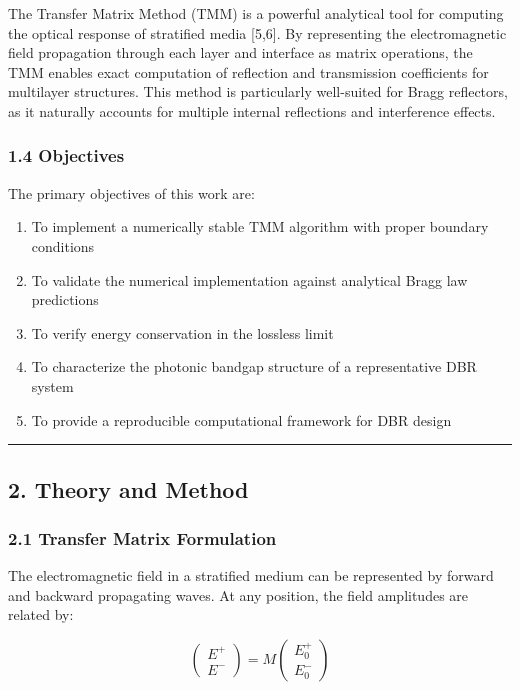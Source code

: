 \documentclass[
]{article}
\providecommand{\tightlist}{%
  \setlength{\itemsep}{0pt}\setlength{\parskip}{0pt}}
\begin{document}
The Transfer Matrix Method (TMM) is a powerful analytical tool for
computing the optical response of stratified media {[}5,6{]}. By
representing the electromagnetic field propagation through each layer
and interface as matrix operations, the TMM enables exact computation of
reflection and transmission coefficients for multilayer structures. This
method is particularly well-suited for Bragg reflectors, as it naturally
accounts for multiple internal reflections and interference effects.

\subsubsection{1.4 Objectives}\label{objectives}

The primary objectives of this work are:

\begin{enumerate}
\def\labelenumi{\arabic{enumi}.}
\tightlist
\item
  To implement a numerically stable TMM algorithm with proper boundary
  conditions
\item
  To validate the numerical implementation against analytical Bragg law
  predictions
\item
  To verify energy conservation in the lossless limit
\item
  To characterize the photonic bandgap structure of a representative DBR
  system
\item
  To provide a reproducible computational framework for DBR design
\end{enumerate}

\begin{center}\rule{0.5\linewidth}{0.5pt}\end{center}

\subsection{2. Theory and Method}\label{theory-and-method}

\subsubsection{2.1 Transfer Matrix
Formulation}\label{transfer-matrix-formulation}

The electromagnetic field in a stratified medium can be represented by
forward and backward propagating waves. At any position, the field
amplitudes are related by:

\[\begin{pmatrix} E^+ \\ E^- \end{pmatrix} = M \begin{pmatrix} E^+_0 \\ E^-_0 \end{pmatrix}\]
\end{document}

